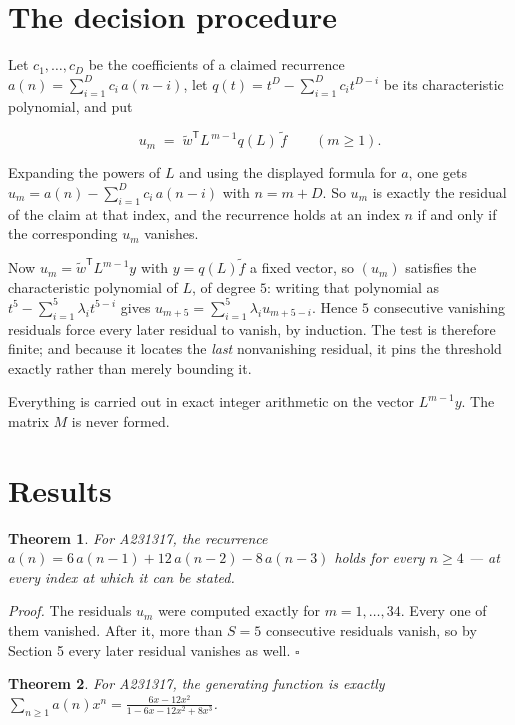 \documentclass[11pt]{article}
\newtheorem{theorem}{Theorem}
\theoremstyle{definition}
\begin{document}
\section{The decision procedure}

Let $c_1,\dots,c_D$ be the coefficients of a claimed recurrence $a(n) = \sum_{i=1}^{D} c_i\,a(n-i)$, let $q(t) = t^{D} - \sum_{i=1}^{D} c_i t^{D-i}$ be its characteristic polynomial, and put

\[u_m \;=\; \tilde w^{\mathsf T} L^{\,m-1} q(L)\,\tilde f \qquad (m \ge 1).\]

Expanding the powers of $L$ and using the displayed formula for $a$, one gets $u_m = a(n) - \sum_{i=1}^{D} c_i\,a(n-i)$ with $n = m + D$. So $u_m$ is exactly the residual of the claim at that index, and the recurrence holds at an index $n$ if and only if the corresponding $u_m$ vanishes.

Now $u_m = \tilde w^{\mathsf T} L^{m-1} y$ with $y = q(L)\tilde f$ a fixed vector, so $(u_m)$ satisfies the characteristic polynomial of $L$, of degree $5$: writing that polynomial as $t^{5} - \sum_{i=1}^{5} \lambda_i t^{5-i}$ gives $u_{m+5} = \sum_{i=1}^{5} \lambda_i u_{m+5-i}$. Hence $5$ consecutive vanishing residuals force every later residual to vanish, by induction. The test is therefore finite; and because it locates the {\itshape last} nonvanishing residual, it pins the threshold exactly rather than merely bounding it.

Everything is carried out in exact integer arithmetic on the vector $L^{m-1}y$. The matrix $M$ is never formed.

\section{Results}

\begin{theorem} For A231317, the recurrence $a(n) = 6\,a(n-1) + 12\,a(n-2) - 8\,a(n-3)$ holds for every $n \ge 4$ --- at every index at which it can be stated.\end{theorem}

{\itshape Proof.} The residuals $u_m$ were computed exactly for $m = 1,\dots,34$. Every one of them vanished. After it, more than $S = 5$ consecutive residuals vanish, so by Section 5 every later residual vanishes as well. $\square$

\begin{theorem} For A231317, the generating function is exactly $\sum_{n\ge 1} a(n)x^n = \frac{6x - 12x^{2}}{1 - 6x - 12x^{2} + 8x^{3}}$.\end{theorem}
\end{document}

